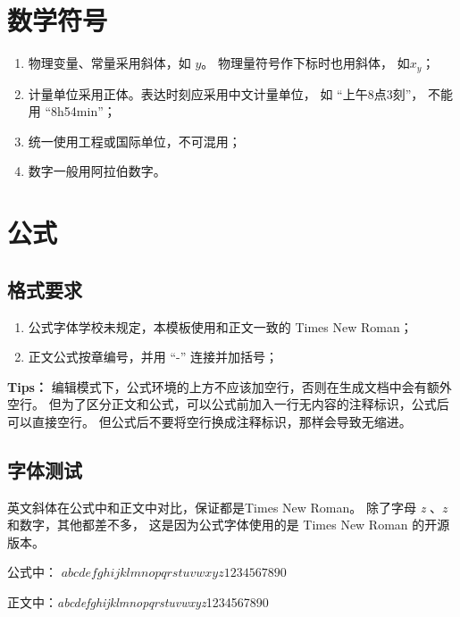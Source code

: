 \section{数学符号}

\begin{enumerate}
	\item 物理变量、常量采用斜体，如 $y$。 物理量符号作下标时也用斜体， 如$x_y$；
	\item 计量单位采用正体。表达时刻应采用中文计量单位，
				如 ``上午8点3刻''， 不能用 ``8h54min''；
	\item 统一使用工程或国际单位，不可混用；
	\item 数字一般用阿拉伯数字。
\end{enumerate}

\section{公式}

\subsection{格式要求}

\begin{enumerate}
	\item 公式字体学校未规定，本模板使用和正文一致的 Times New Roman；
	\item 正文公式按章编号，并用 ``-'' 连接并加括号；
\end{enumerate}

\textbf{Tips：} 编辑模式下，公式环境的上方不应该加空行，否则在生成文档中会有额外空行。
但为了区分正文和公式，可以公式前加入一行无内容的注释标识，公式后可以直接空行。
但公式后不要将空行换成注释标识，那样会导致无缩进。

\subsection{字体测试}

英文斜体在公式中和正文中对比，保证都是Times New Roman。
除了字母 \textit{z} 、$z$和数字，其他都差不多，
这是因为公式字体使用的是 Times New Roman 的开源版本。

公式中： $abcdefghijklmnopqrstuvwxyz1234567890$

正文中：\textit{abcdefghijklmnopqrstuvwxyz}1234567890

